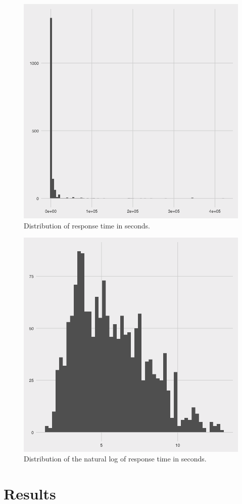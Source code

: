 \documentclass[12pt]{nuthesis}	%
\begin{document}
\begin{figure}[h]
\centering
\includegraphics[width=.7\textwidth]{figures/response_time_distribution}
\caption{Distribution of response time in seconds.}
\label{fig:response_time}
\end{figure}

\begin{figure}[h]
\centering
\includegraphics[width=.7\textwidth]{figures/log_response_time_distribution}
\caption{Distribution of the natural log of response time in seconds.}
\label{fig:log_response_time}
\end{figure}

\chapter{Results}
\end{document}
